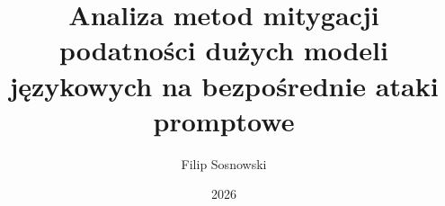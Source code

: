 \documentclass[thesis=mgr,faculty=ee]{EE-dyplom}
\title{Analiza metod mitygacji podatności dużych modeli językowych na bezpośrednie ataki promptowe}
\author{Filip Sosnowski}
\date{2026}
\begin{document}
\frontpages



\bibliografia


\acronymslist
\listoffigures
\listoftables
\end{document}
